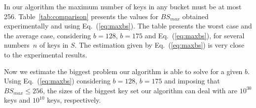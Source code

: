 
In our algorithm the maximum number of keys in any bucket must be at most 256. 
Table~\ref{tab:comparison} presents the values for $\mathit{BS}_{\mathit{max}}$
obtained experimentally and using Eq.~(\ref{eq:maxbs}).
The table presents the worst case and the average case, 
considering $b=128$,  $b=175$ and Eq.~(\ref{eq:maxbs}),
for several numbers~$n$ of keys in $S$. 
The estimation given by Eq.~(\ref{eq:maxbs}) is very close to the experimental
results.

Now we estimate the biggest problem our algorithm is able to solve for 
a given $b$. 
Using Eq.~(\ref{eq:maxbs}) considering $b=128$, $b=175$ and imposing
that~$\mathit{BS}_{\mathit{max}}\leq256$, 
the sizes of the biggest key set our algorithm 
can deal with are $10^{30}$ keys and $10^{10}$ keys, respectively. 

